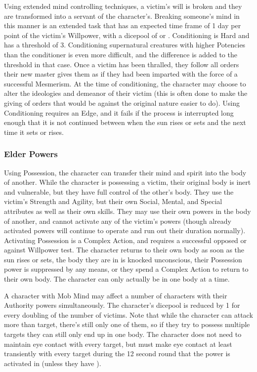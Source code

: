  Using extended mind controlling techniques, a victim's will is broken and they are transformed into a servant of the character's. Breaking someone's mind in this manner is an extended task that has an expected time frame of 1 day per point of the victim's Willpower, with a dicepool of  or . Conditioning is Hard and has a threshold of 3. Conditioning supernatural creatures with higher Potencies than the conditioner is even more difficult, and the difference is added to the threshold in that case. Once a victim has been thralled, they follow all orders their new master gives them as if they had been imparted with the force of a successful Mesmerism. At the time of conditioning, the character may choose to alter the ideologies and demeanor of their victim (this is often done to make the giving of orders that would be against the original nature easier to do). Using Conditioning requires an Edge, and it fails if the process is interrupted long enough that it is not continued between when the sun rises or sets and the next time it sets or rises.

\subsubsection{Elder Powers}

 Using Possession, the character can transfer their mind and spirit into the body of another. While the character is possessing a victim, their original body is inert and vulnerable, but they have full control of the other's body. They use the victim's Strength and Agility, but their own Social, Mental, and Special attributes as well as their own skills. They may use their own powers in the body of another, and cannot activate any of the victim's powers (though already activated powers will continue to operate and run out their duration normally). Activating Possession is a Complex Action, and requires a successful opposed  or  against Willpower test. The character returns to their own body as soon as the sun rises or sets, the body they are in is knocked unconscious, their Possession power is suppressed by any means, or they spend a Complex Action to return to their own body. The character can only actually be in one body at a time.

 A character with Mob Mind may affect a number of characters with their Authority powers simultaneously. The character's dicepool is reduced by 1 for every doubling of the number of victims. Note that while the character can attack more than target, there's still only one of them, so if they try to possess multiple targets they can still only end up in one body. The character does not need to maintain eye contact with every target, but must make eye contact at least transiently with every target during the 12 second round that the power is activated in (unless they have ).


